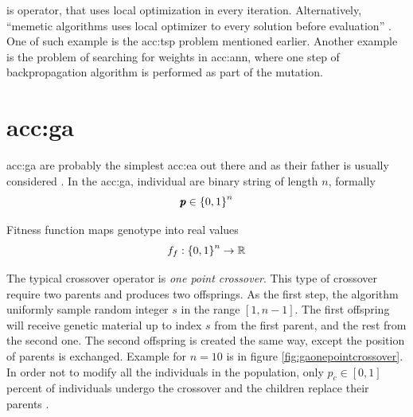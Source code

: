  is operator, that uses local optimization in every iteration. Alternatively, \enquote{memetic algorithms uses local optimizer to every solution before evaluation} \citep{HowToSolveItModernHeuristics}. One of such example is the \acrlong{acc:tsp} problem mentioned earlier. Another example is the problem of searching for weights in \acrshort{acc:ann}, where one step of backpropagation algorithm is performed as part of the mutation.




\section{\texorpdfstring{\acrlong*{acc:ga}}{Genetic algorithms}}

\acrfull{acc:ga} are probably the simplest \acrfull{acc:ea} out there and as their father is usually considered . In the \acrshort{acc:ga}, individual are binary string of length $n$, formally
$$ \pmb{p} \in \left\{0,1\right\}^{n} $$

Fitness function maps genotype into real values
$$ f_f:\left\{0,1\right\}^{n}\rightarrow\mathbb{R} $$

The typical crossover operator is \emph{one point crossover}. This type of crossover require two parents and produces two offsprings. As the first step, the algorithm uniformly sample random integer $s$ in the range $\left[ 1, n-1 \right]$. The first offspring will receive genetic material up to index $s$ from the first parent, and the rest from the second one. The second offspring is created the same way, except the position of parents is exchanged. Example for $n=10$ is in figure \ref{fig:gaonepointcrossover}. In order not to modify all the individuals in the population, only $p_c\in\left[0,1\right]$ percent of individuals undergo the crossover and the children replace their parents \citep{IntroductionToEA}.


